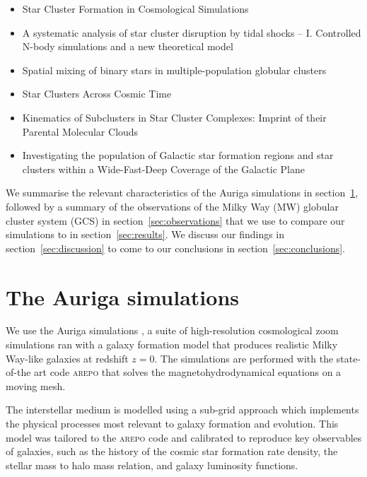 \documentclass[a4paper,fleqn,usenatbib]{mnras}
\begin{document}
\begin{itemize}
\item Star Cluster Formation in Cosmological Simulations \citep{2017ApJ...834...69L, 2018ApJ...861..107L, 2018arXiv181011036L}
\item A systematic analysis of star cluster disruption by tidal shocks -- I. Controlled N-body simulations and a new theoretical model \citep{2018arXiv181200014W}
\item Spatial mixing of binary stars in multiple-population globular clusters \citep{2018MNRAS.tmp.3147H}
\item Star Clusters Across Cosmic Time \citep{2018arXiv181201615K}
\item Kinematics of Subclusters in Star Cluster Complexes: Imprint of their Parental Molecular Clouds \citep{2018arXiv181201858F}
\item Investigating the population of Galactic star formation regions and star clusters within a Wide-Fast-Deep Coverage of the Galactic Plane  \citep{2018arXiv181203025P}
\end{itemize}


We summarise the relevant characteristics of the Auriga simulations in 
section~\ref{sec:auriga}, followed by a summary of the observations of the
Milky Way (MW) globular cluster system (GCS) in section~\ref{sec:observations}
that we use to compare our simulations to in section~\ref{sec:results}. We
discuss our findings in section~\ref{sec:discussion} to come to our conclusions 
in section~\ref{sec:conclusions}.


\section{The Auriga simulations}
\label{sec:auriga}
We use the Auriga simulations \citep[][hereafter G17]{2017MNRAS.467..179G}, a 
suite of high-resolution cosmological zoom simulations ran with a galaxy
formation model that produces realistic Milky Way-like galaxies at redshift
$z=0$. The simulations are performed with the state-of-the art code \textsc{arepo}
\citep{2010MNRAS.401..791S, 2016MNRAS.455.1134P} that solves the 
magnetohydrodynamical equations on a moving mesh.

The interstellar medium is modelled using a sub-grid approach which implements
the physical processes most relevant to galaxy formation and evolution. 
This model was tailored to the \textsc{arepo} code and calibrated to reproduce
key observables of galaxies, such as the history of the cosmic star formation rate 
density, the stellar mass to halo mass relation, and galaxy luminosity functions.
\end{document}
